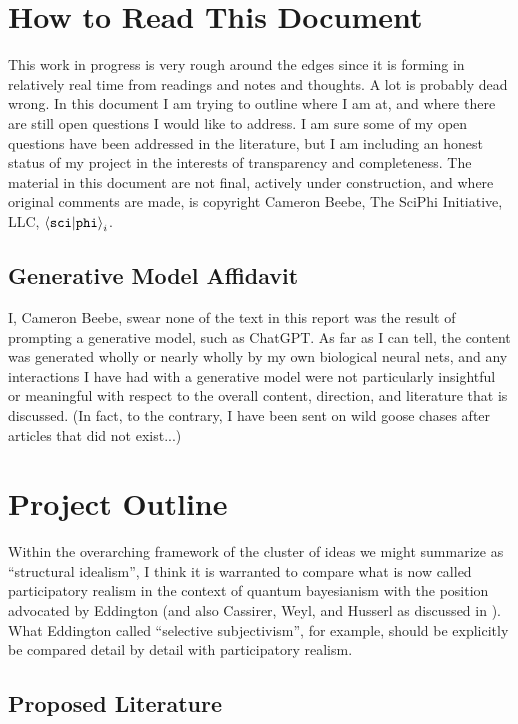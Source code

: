 \documentclass{article}
\begin{document}
\section{How to Read This Document}

This work in progress is very rough around the edges since it is forming in relatively real time from readings and notes and thoughts.  A lot is probably dead wrong.  In this document I am trying to outline where I am at, and where there are still open questions I would like to address.  I am sure some of my open questions have been addressed in the literature, but I am including an honest status of my project in the interests of transparency and completeness.  The material in this document are not final, actively under construction, and where original comments are made, is copyright Cameron Beebe, The SciPhi Initiative, LLC, $\braket{\texttt{sci}|\texttt{phi}}_i$.




\subsection{Generative Model Affidavit}

I, Cameron Beebe, swear none of the text in this report was the result of prompting a generative model, such as ChatGPT.  As far as I can tell, the content was generated wholly or nearly wholly by my own biological neural nets, and any interactions I have had with a generative model were not particularly insightful or meaningful with respect to the overall content, direction, and literature that is discussed.  (In fact, to the contrary, I have been sent on wild goose chases after articles that did not exist...)

\section{Project Outline}




Within the overarching framework of the cluster of ideas we might summarize as ``structural idealism'', I think it is warranted to compare what is now called participatory realism in the context of quantum bayesianism with the position advocated by Eddington (and also Cassirer, Weyl, and Husserl as discussed in \cite{Ryckman2005}).  What Eddington called ``selective subjectivism'', for example, should be explicitly be compared detail by detail with participatory realism. 


\subsection{Proposed Literature}
\end{document}
